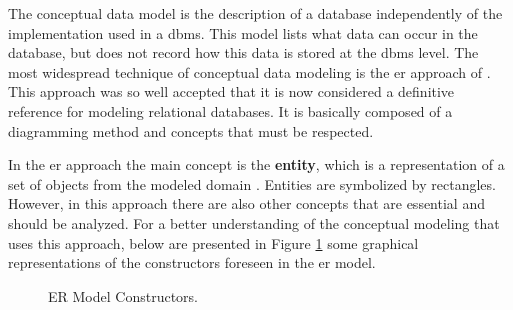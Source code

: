 The conceptual data model is the description of a database independently of the implementation used in a \ac{dbms}.
This model lists what data can occur in the database, but does not record how this data is stored at the \ac{dbms} level.
The most widespread technique of conceptual data modeling is the \ac{er} approach of \cite{Chen:1976}.
This approach was so well accepted that it is now considered a definitive reference for modeling relational databases.
It is basically composed of a diagramming method and concepts that must be respected.

In the \ac{er} approach the main concept is the \textbf{entity}, which is a representation of a set of objects from the modeled domain \cite{Heuser:2009}.
Entities are symbolized by rectangles.
However, in this approach there are also other concepts that are essential and should be analyzed.
For a better understanding of the conceptual modeling that uses this approach, below are presented in Figure \ref{fig:ERConstructors} some graphical representations of the constructors foreseen in the \ac{er} model.

\begin{figure} [!htb]
    \centering
    \caption{ER Model Constructors.}
    \label{fig:ERConstructors}
    
\end{figure}

